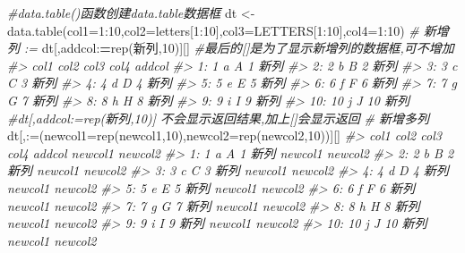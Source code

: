 \documentclass[
]{book}
\newenvironment{Shaded}{\begin{snugshade}}{\end{snugshade}}
\newcommand{\AttributeTok}[1]{\textcolor[rgb]{0.77,0.63,0.00}{#1}}
\newcommand{\CommentTok}[1]{\textcolor[rgb]{0.56,0.35,0.01}{\textit{#1}}}
\newcommand{\DecValTok}[1]{\textcolor[rgb]{0.00,0.00,0.81}{#1}}
\newcommand{\ErrorTok}[1]{\textcolor[rgb]{0.64,0.00,0.00}{\textbf{#1}}}
\newcommand{\FunctionTok}[1]{\textcolor[rgb]{0.00,0.00,0.00}{#1}}
\newcommand{\NormalTok}[1]{#1}
\newcommand{\OtherTok}[1]{\textcolor[rgb]{0.56,0.35,0.01}{#1}}
\newcommand{\SpecialCharTok}[1]{\textcolor[rgb]{0.00,0.00,0.00}{#1}}
\newcommand{\StringTok}[1]{\textcolor[rgb]{0.31,0.60,0.02}{#1}}
\begin{document}
\begin{Shaded}
\begin{Highlighting}[]
\CommentTok{\#data.table()函数创建data.table数据框}
\NormalTok{dt }\OtherTok{\textless{}{-}} \FunctionTok{data.table}\NormalTok{(}\AttributeTok{col1=}\DecValTok{1}\SpecialCharTok{:}\DecValTok{10}\NormalTok{,}\AttributeTok{col2=}\NormalTok{letters[}\DecValTok{1}\SpecialCharTok{:}\DecValTok{10}\NormalTok{],}\AttributeTok{col3=}\NormalTok{LETTERS[}\DecValTok{1}\SpecialCharTok{:}\DecValTok{10}\NormalTok{],}\AttributeTok{col4=}\DecValTok{1}\SpecialCharTok{:}\DecValTok{10}\NormalTok{)}
\CommentTok{\# 新增列 :=}
\NormalTok{dt[,addcol}\SpecialCharTok{:}\ErrorTok{=}\FunctionTok{rep}\NormalTok{(}\StringTok{\textquotesingle{}新列\textquotesingle{}}\NormalTok{,}\DecValTok{10}\NormalTok{)][] }\CommentTok{\#最后的[]是为了显示新增列的数据框,可不增加}
\CommentTok{\#\textgreater{}     col1 col2 col3 col4 addcol}
\CommentTok{\#\textgreater{}  1:    1    a    A    1   新列}
\CommentTok{\#\textgreater{}  2:    2    b    B    2   新列}
\CommentTok{\#\textgreater{}  3:    3    c    C    3   新列}
\CommentTok{\#\textgreater{}  4:    4    d    D    4   新列}
\CommentTok{\#\textgreater{}  5:    5    e    E    5   新列}
\CommentTok{\#\textgreater{}  6:    6    f    F    6   新列}
\CommentTok{\#\textgreater{}  7:    7    g    G    7   新列}
\CommentTok{\#\textgreater{}  8:    8    h    H    8   新列}
\CommentTok{\#\textgreater{}  9:    9    i    I    9   新列}
\CommentTok{\#\textgreater{} 10:   10    j    J   10   新列}
\CommentTok{\#dt[,addcol:=rep(\textquotesingle{}新列\textquotesingle{},10)] 不会显示返回结果,加上[]会显示返回}
\CommentTok{\# 新增多列}
\NormalTok{dt[,}\StringTok{\textasciigrave{}}\AttributeTok{:=}\StringTok{\textasciigrave{}}\NormalTok{(}\AttributeTok{newcol1=}\FunctionTok{rep}\NormalTok{(}\StringTok{\textquotesingle{}newcol1\textquotesingle{}}\NormalTok{,}\DecValTok{10}\NormalTok{),}\AttributeTok{newcol2=}\FunctionTok{rep}\NormalTok{(}\StringTok{\textquotesingle{}newcol2\textquotesingle{}}\NormalTok{,}\DecValTok{10}\NormalTok{))][]}
\CommentTok{\#\textgreater{}     col1 col2 col3 col4 addcol newcol1 newcol2}
\CommentTok{\#\textgreater{}  1:    1    a    A    1   新列 newcol1 newcol2}
\CommentTok{\#\textgreater{}  2:    2    b    B    2   新列 newcol1 newcol2}
\CommentTok{\#\textgreater{}  3:    3    c    C    3   新列 newcol1 newcol2}
\CommentTok{\#\textgreater{}  4:    4    d    D    4   新列 newcol1 newcol2}
\CommentTok{\#\textgreater{}  5:    5    e    E    5   新列 newcol1 newcol2}
\CommentTok{\#\textgreater{}  6:    6    f    F    6   新列 newcol1 newcol2}
\CommentTok{\#\textgreater{}  7:    7    g    G    7   新列 newcol1 newcol2}
\CommentTok{\#\textgreater{}  8:    8    h    H    8   新列 newcol1 newcol2}
\CommentTok{\#\textgreater{}  9:    9    i    I    9   新列 newcol1 newcol2}
\CommentTok{\#\textgreater{} 10:   10    j    J   10   新列 newcol1 newcol2}
\end{Highlighting}
\end{Shaded}
\end{document}
